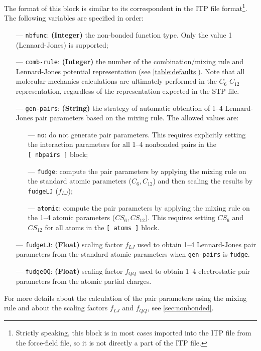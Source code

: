 \documentclass[10pt,a4paper,openany]{memoir}
\numberwithin{equation}{section}
\begin{document}
The format of this block is similar to its correspondent in the ITP file format\footnote{Strictly speaking, this block is in most cases imported into the ITP file from the force-field file, so it is not directly a part of the ITP file.}.
The following variables are specified in order:
\begin{itemize}
\item [---] \texttt{nbfunc}: \textbf{(Integer)} the non-bonded function type. Only the value 1 (Lennard-Jones) is supported;
\item [---] \texttt{comb-rule}: \textbf{(Integer)} the number of the combination/mixing rule and Lennard-Jones potential representation (see \autoref{table:defaults}).
  Note that all molecular-mechanics calculations are ultimately performed in the $C_6$-$C_{12}$ representation, regardless of the representation expected in the STP file.
\item [---] \texttt{gen-pairs}: \textbf{(String)} the strategy of automatic obtention of  1--4 Lennard-Jones pair parameters based on the mixing rule. The allowed values are:
  \begin{itemize}
  \item [---] \texttt{no}: do not generate pair parameters. This requires explicitly setting the interaction parameters for all 1--4 nonbonded pairs in the \texttt{[~nbpairs~]} block;
  \item [---] \texttt{fudge}: compute the pair parameters by applying the mixing rule on the standard atomic parameters ($C_6,C_{12}$) and then scaling the results by \texttt{fudgeLJ} ($f_{LJ}$);
  \item [---] \texttt{atomic}: compute the pair parameters by applying the mixing rule on the 1--4 atomic parameters ($CS_6,CS_{12}$). This requires setting $CS_6$ and $CS_{12}$ for all atoms in the \texttt{[~atoms~]} block.
  \end{itemize}
\item [---] \texttt{fudgeLJ}: \textbf{(Float)} scaling factor $f_{LJ}$ used to obtain 1--4 Lennard-Jones pair parameters from the standard atomic parameters when \texttt{gen-pairs} is \texttt{fudge}.
\item [---] \texttt{fudgeQQ}: \textbf{(Float)} scaling factor $f_{QQ}$ used to obtain 1--4 electrostatic pair parameters from the atomic partial charges.
\end{itemize}
For more details about the calculation of the pair parameters using the mixing rule and about the scaling factors $f_{LJ}$ and $f_{QQ}$, see \autoref{sec:nonbonded}.
\end{document}
